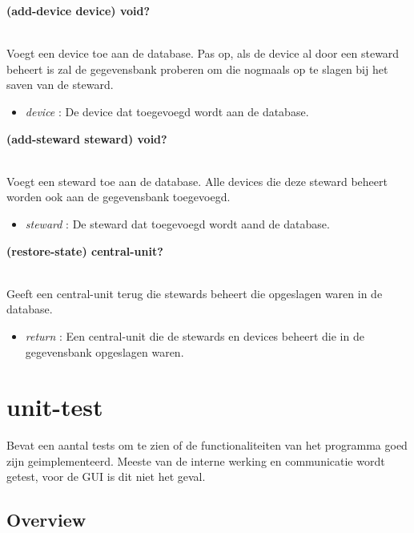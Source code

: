 \documentclass{article}
\newcommand{\ar}{\ding{213} }
\newcommand{\code}[1]{\textcolor{code}{#1}}
\newcommand{\lb}[1][]{\code{(#1}}
\newcommand{\rb}{\code{)}}
\newcommand{\racket}[1]{
	{\color{blue}\textbf{#1}}
}
\begin{document}
\begin{framed}
	\hypertarget{manager:add-device}{\racket{\lb[add-device] device\rb \ar \code{void?}}}
	\\Voegt een device toe aan de database. Pas op, als de device al door een steward beheert is zal de gegevensbank proberen om die nogmaals op te slagen bij het saven van de steward.
	\begin{itemize}
		\item \emph{device} : De device dat toegevoegd wordt aan de database.
	\end{itemize}
\end{framed}

\begin{framed}
	\hypertarget{manager:add-steward}{\racket{\lb[add-steward] steward\rb \ar \code{void?}}}
	\\Voegt een steward toe aan de database. Alle devices die deze steward beheert worden ook aan de gegevensbank toegevoegd.
	\begin{itemize}
		\item \emph{steward} : De steward dat toegevoegd wordt aand de database.
	\end{itemize}
\end{framed}

\begin{framed}
	\hypertarget{manager:restore-state}{\racket{\lb[restore-state]\rb \ar \code{central-unit?}}}
	\\Geeft een central-unit terug die stewards beheert die opgeslagen waren in de database.
	\begin{itemize}
		\item \emph{return} : Een central-unit die de stewards en devices beheert die in de gegevensbank opgeslagen waren.
	\end{itemize}
\end{framed}

\newpage
\hypertarget{unit-test}{\section{unit-test}}
Bevat een aantal tests om te zien of de functionaliteiten van het programma goed zijn geimplementeerd. Meeste van de interne werking en communicatie wordt getest, voor de GUI is dit niet het geval.

\subsection{Overview}
\end{document}
